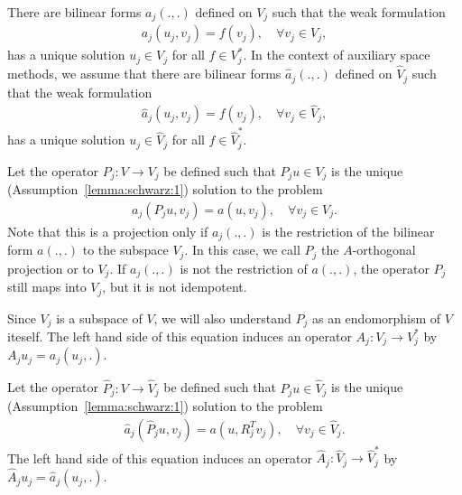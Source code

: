 \begin{assumption}
  \label{lemma:schwarz:1}
  There are bilinear forms $a_j(.,.)$ defined on $V_j$ such that the weak formulation
  \begin{gather}
    \label{eq:schwarz:1}
    a_j(u_j,v_j) = f(v_j),
    \quad\forall v_j\in V_j,
  \end{gather}
  has a unique solution $u_j\in V_j$ for all $f\in V_j^*$. In the
  context of auxiliary space methods, we assume that there are
  bilinear forms $\hat a_j(.,.)$ defined on $\hat V_j$ such
  that the weak formulation
  \begin{gather}
    \label{eq:schwarz:1a}
    \hat a_j(u_j,v_j) = f(v_j),
    \quad\forall v_j\in \hat V_j,
  \end{gather}
  has a unique solution $u_j\in \hat V_j$ for all $f\in \hat V_j^*$.
\end{assumption}

\begin{definition}
  \label{definition:schwarz:1}
   Let the  operator $P_j: V \to V_j$ be defined such that
  $P_j u \in V_j$ is the unique (Assumption~\ref{lemma:schwarz:1})
  solution to the problem
  \begin{gather}
    \label{eq:schwarz:2}
    a_j(P_j u,v_j) = a(u,v_j),\quad\forall v_j\in V_j.
  \end{gather}
  Note that this is a projection only if $a_j(.,.)$ is the restriction
  of the bilinear form $a(.,.)$ to the subspace $V_j$. In this
  case, we call $P_j$ the $A$-orthogonal projection or
   to $V_j$. If $a_j(.,.)$ is not the
  restriction of $a(.,.)$, the operator $P_j$ still maps into $V_j$,
  but it is not idempotent.

  Since $V_j$ is a subspace of $V$, we will also understand $P_j$ as
  an endomorphism of $V$ iteself. The left hand side of this equation
  induces an operator $A_j: V_j \to V_j^*$ by $A_j u_j = a_j(u_j,.)$.
\end{definition}

\begin{definition}
  \label{definition:schwarz:1a}
  Let the operator $\hat P_j: V \to \hat V_j$ be defined such that $\hat P_j u \in \hat V_j$ is
  the unique (Assumption~\ref{lemma:schwarz:1}) solution to the problem
  \begin{gather}
    \label{eq:schwarz:2a}
    \hat a_j(\hat P_j u,v_j) = a(u,R_j^T v_j),\quad\forall v_j\in \hat V_j.
  \end{gather}
  The left hand side of this equation induces an operator $\hat A_j:
  \hat V_j \to \hat V_j^*$ by $\hat A_j u_j = \hat a_j(u_j,.)$.
\end{definition}

